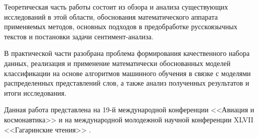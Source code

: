 \bigskip
Теоретическая часть работы состоит из обзора и анализа существующих исследований в этой области, обоснования математического аппарата применяемых методов, основных подходов в предобработке русскоязычных текстов и постановки задачи сентимент-анализа.


\bigskip
В практической части разобрана проблема формирования качественного набора данных, реализация и применение математически обоснованных моделей классификации на основе алгоритмов машинного обучения в связке с моделями распределенных представлений слов, а также анализ полученных результатов и итоги исследования.

\bigskip
Данная работа представлена на 19-й международной конференции <<Авиация и космонавтика>> \cite{avia} и на международной молодежной научной конференции XLVII <<Гагаринские чтения>> \cite{gagar}.


